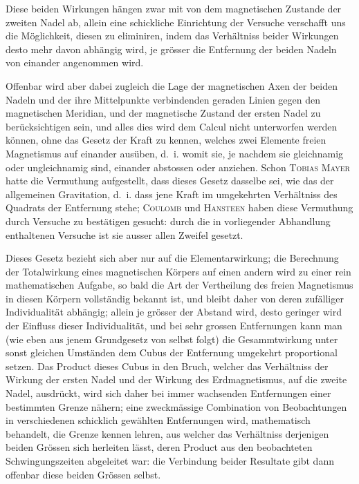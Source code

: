 \documentclass[12pt,a4paper]{article}
\begin{document}
Diese beiden Wirkungen hängen zwar mit von dem magnetischen Zustande der zweiten Nadel ab, allein eine schickliche Einrichtung der Versuche verschafft uns die Möglichkeit, diesen zu eliminiren, indem das Verhältniss beider Wirkungen desto mehr davon abhängig wird, je grösser die Entfernung der beiden Nadeln von einander angenommen wird.

Offenbar wird aber dabei zugleich die Lage der magnetischen Axen der beiden Nadeln und der ihre Mittelpunkte verbindenden geraden Linien gegen den magnetischen Meridian, und der magnetische Zustand der ersten Nadel zu berücksichtigen sein, und alles dies wird dem Calcul nicht unterworfen werden können, ohne das Gesetz der Kraft zu kennen, welches zwei Elemente freien Magnetismus auf einander ausüben, d.~i. womit sie, je nachdem sie gleichnamig oder ungleichnamig sind, einander abstossen oder anziehen. Schon \textsc{Tobias Mayer} hatte die Vermuthung aufgestellt, dass dieses Gesetz dasselbe sei, wie das der allgemeinen Gravitation, d.~i. dass jene Kraft im umgekehrten Verhältniss des Quadrats der Entfernung stehe; \textsc{Coulomb} und \textsc{Hansteen} haben diese Vermuthung durch Versuche zu bestätigen gesucht: durch die in vorliegender Abhandlung enthaltenen Versuche ist sie ausser allen Zweifel gesetzt.

Dieses Gesetz bezieht sich aber nur auf die Elementarwirkung; die Berechnung der Totalwirkung eines magnetischen Körpers auf einen andern wird zu einer rein mathematischen Aufgabe, so bald die Art der Vertheilung des freien Magnetismus in diesen Körpern vollständig bekannt ist, und bleibt daher von deren zufälliger Individualität abhängig; allein je grösser der Abstand wird, desto geringer wird der Einfluss dieser Individualität, und bei sehr grossen Entfernungen kann man (wie eben aus jenem Grundgesetz von selbst folgt) die Gesammtwirkung unter sonst gleichen Umständen dem Cubus der Entfernung umgekehrt proportional setzen. Das Product dieses Cubus in den Bruch, welcher das Verhältniss der Wirkung der ersten Nadel und der Wirkung des Erdmagnetismus, auf die zweite Nadel, ausdrückt, wird sich daher bei immer wachsenden Entfernungen einer bestimmten Grenze nähern; eine zweckmässige Combination von Beobachtungen in verschiedenen schicklich gewählten Entfernungen wird, mathematisch behandelt, die Grenze kennen lehren, aus welcher das Verhältniss derjenigen beiden Grössen sich herleiten lässt, deren Product aus den beobachteten Schwingungszeiten abgeleitet war: die Verbindung beider Resultate gibt dann offenbar diese beiden Grössen selbst.
\end{document}

